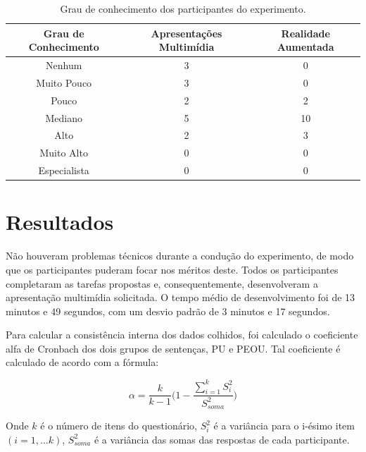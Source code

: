 \documentclass[../main.tex]{subfiles}
\begin{document}
\begin{table}[ht!]
\caption{Grau de conhecimento dos participantes do experimento.}
\label{tab:expParticipantes}

\begin{tabular}{@{}ccc@{}}
\toprule
\textbf{Grau de Conhecimento} & \textbf{Apresentações Multimídia} & \textbf{Realidade Aumentada} \\ \midrule
Nenhum                        & 3                                 & 0                            \\
Muito Pouco                   & 3                                 & 0                            \\
Pouco                         & 2                                 & 2                            \\
Mediano                       & 5                                 & 10                           \\
Alto                          & 2                                 & 3                            \\
Muito Alto                    & 0                                 & 0                            \\
Especialista                  & 0                                 & 0                            \\ \bottomrule
\end{tabular}
\end{table}

\section{Resultados}
\label{sec:resultados}

Não houveram problemas técnicos durante a condução do experimento, de modo que os participantes puderam focar nos méritos deste. Todos os participantes completaram as tarefas propostas e, consequentemente, desenvolveram a apresentação multimídia solicitada. O tempo médio de desenvolvimento foi de 13 minutos e 49 segundos, com um desvio padrão de 3 minutos e 17 segundos.

Para calcular a consistência interna dos dados colhidos, foi calculado o coeficiente alfa de Cronbach dos dois grupos de sentenças, PU e PEOU. Tal coeficiente é calculado de acordo com a fórmula:

\[\alpha = \frac{k}{k-1}\Bigg(1 - \frac{\sum_{i = 1}^{k}S_i^2}{S_{soma}^2}\Bigg)\]

Onde \(k\) é o número de itens do questionário, \(S_i^2\) é a variância para o i-ésimo item \((i=1,...k)\), \(S_{soma}^2\) é a variância das somas das respostas de cada participante.
\end{document}
